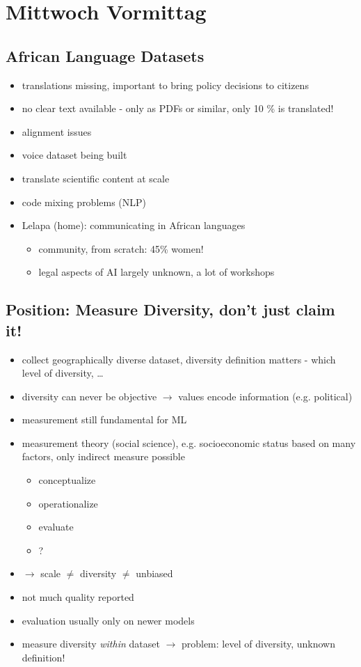 \documentclass[a4paper]{article}
\begin{document}
\section*{Mittwoch Vormittag}
\subsection*{African Language Datasets}
\begin{itemize}
    \item translations missing, important to bring policy decisions to citizens
    \item no clear text available - only as PDFs or similar, only 10 \% is translated!
    \item alignment issues
    \item voice dataset being built
    \item translate scientific content at scale
    \item code mixing problems (NLP)
    \item Lelapa (home): communicating in African languages
          \begin{itemize}
              \item community, from scratch: 45\% women!
              \item legal aspects of AI largely unknown, a lot of workshops
          \end{itemize}
\end{itemize}
\subsection*{Position: Measure Diversity, don't just claim it!}
\begin{itemize}
    \item collect geographically diverse dataset, diversity definition matters - which level of diversity, \dots
    \item diversity can never be objective $\rightarrow$ values encode information (e.g. political)
    \item measurement still fundamental for ML
    \item measurement theory (social science), e.g. socioeconomic status based on many factors, only indirect measure possible
          \begin{itemize}
              \item conceptualize
              \item operationalize
              \item evaluate
              \item ?
          \end{itemize}
    \item $\rightarrow$ scale $\neq$ diversity $\neq$ unbiased
    \item not much quality reported
    \item evaluation usually only on newer models
    \item measure diversity \emph{within} dataset $\rightarrow$ problem: level of diversity, unknown definition!
\end{itemize}
\end{document}
